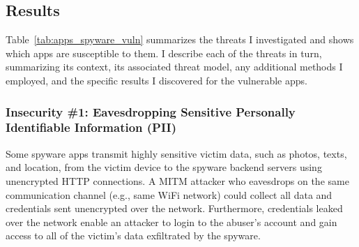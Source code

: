 \subsection{Results}

Table~\ref{tab:apps_spyware_vuln} summarizes the threats I
investigated and shows which apps are susceptible to them.
%
I describe each of the threats in turn, summarizing its context, its
associated threat model, any additional methods I employed, and the
specific results I discovered for the vulnerable apps.




\subsubsection*{Insecurity \#1: Eavesdropping Sensitive Personally Identifiable Information (PII)}

Some spyware apps transmit highly sensitive victim data, such as photos,
texts, and location, from the victim device to the spyware backend
servers using unencrypted HTTP connections.  A MITM attacker who
eavesdrops on the same communication channel (e.g., same WiFi network)
could collect all data and credentials sent unencrypted
over the network.  Furthermore, credentials leaked over the network enable
an attacker to login to the abuser's account and gain access to all of
the victim's data exfiltrated by the spyware.

